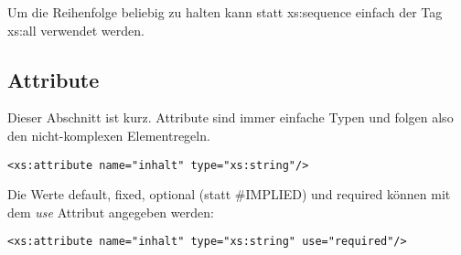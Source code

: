 Um die Reihenfolge beliebig zu halten kann statt xs:sequence einfach der Tag xs:all verwendet werden. 
\subsection{Attribute}
Dieser Abschnitt ist kurz. Attribute sind immer einfache Typen und folgen also den nicht-komplexen Elementregeln.
\begin{verbatim}
<xs:attribute name="inhalt" type="xs:string"/>
\end{verbatim}

Die Werte default, fixed, optional (statt \#IMPLIED) und required können mit dem \textit{use} Attribut angegeben werden:
\begin{verbatim}
<xs:attribute name="inhalt" type="xs:string" use="required"/>
\end{verbatim}


